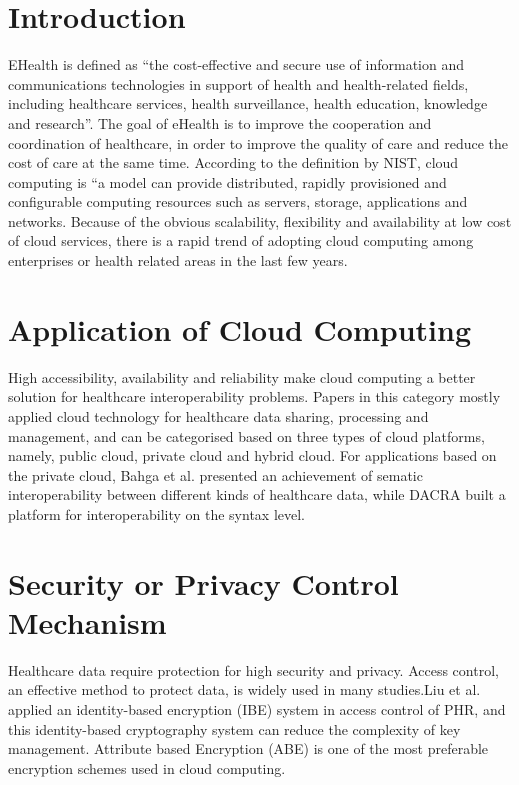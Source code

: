 \documentclass[10pt,a4paper]{article}
\begin{document}
\section{Introduction}
EHealth is defined as “the cost-effective and secure use of information and communications technologies in support of health and health-related fields, including healthcare services, health surveillance, health education, knowledge and research”. \cite{T1} The goal of eHealth is to improve the cooperation and coordination of healthcare, in order to improve the quality of care and reduce the cost of care at the same time. According to the definition by NIST, cloud computing is “a model can provide distributed, rapidly provisioned and configurable computing resources such as servers, storage, applications and networks. \cite{T2} Because of the obvious scalability, flexibility and availability at low cost of cloud services, there is a rapid trend of adopting cloud computing among enterprises or health related areas in the last few years.

\section{Application of Cloud Computing} 
High accessibility, availability and reliability make cloud computing a better solution for healthcare interoperability problems. Papers in this category mostly applied cloud technology for healthcare data sharing, processing and management, and can be categorised based on three types of cloud platforms, namely, public cloud, private cloud and hybrid cloud.
For applications based on the private cloud, Bahga et al.\cite{T3} presented an achievement of sematic interoperability between different kinds of healthcare data, while DACRA \cite{T4} built a platform for interoperability on the syntax level.

\section{Security or Privacy Control Mechanism}
Healthcare data require protection for high security and privacy. Access control, an effective method to protect data, is widely used in many studies.Liu et al. \cite{T5} applied an identity-based encryption (IBE) system in access control of PHR, and this identity-based cryptography system can reduce the complexity of key management. Attribute based Encryption (ABE) is one of the most preferable encryption schemes used in cloud computing.
\end{document}

